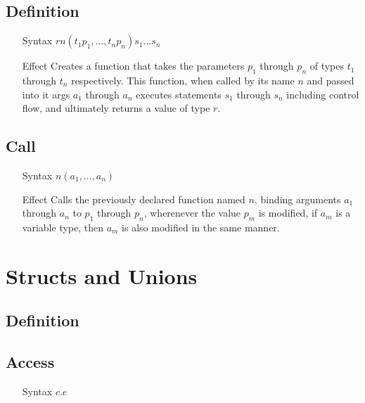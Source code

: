 \subsection{Definition}
\begin{itemize}
\item[Syntax] $r n(t_1 p_1, ..., t_n p_n) { s_1 ... s_n }$
\item[Effect] Creates a function that takes the parameters $p_1$ through $p_n$ of types $t_1$ through $t_n$ respectively. This function, when called by its name $n$ and passed into it args $a_1$ through $a_n$ executes statements $s_1$ through $s_n$ including control flow, and ultimately returns a value of type $r$.
\end{itemize}
\subsection{Call}
\begin{itemize}
\item[Syntax] $n(a_1, ..., a_n)$
\item[Effect] Calls the previously declared function named $n$, binding arguments $a_1$ through $a_n$ to $p_1$ through $p_n$, wherenever the value $p_m$ is modified, if $a_m$ is a variable type, then $a_m$ is also modified in the same manner.
\end{itemize}
\section{Structs and Unions}
\subsection{Definition}
\subsection{Access}
\begin{itemize}
\item[Syntax] $c.e$
\end{itemize}
